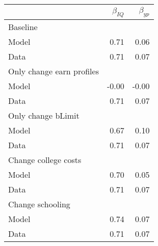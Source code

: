 \begin{tabular}{lrr}
\hline
  & $\beta_{IQ}$  & $\beta_{yp}$  \\ 
\hline
Baseline &   &   \\ 
Model & 0.71  & 0.06  \\ 
Data & 0.71  & 0.07  \\ 
Only change earn profiles &   &   \\ 
Model & -0.00  & -0.00  \\ 
Data & 0.71  & 0.07  \\ 
Only change bLimit &   &   \\ 
Model & 0.67  & 0.10  \\ 
Data & 0.71  & 0.07  \\ 
Change college costs &   &   \\ 
Model & 0.70  & 0.05  \\ 
Data & 0.71  & 0.07  \\ 
Change schooling &   &   \\ 
Model & 0.74  & 0.07  \\ 
Data & 0.71  & 0.07  \\ 
\hline
\end{tabular}%

